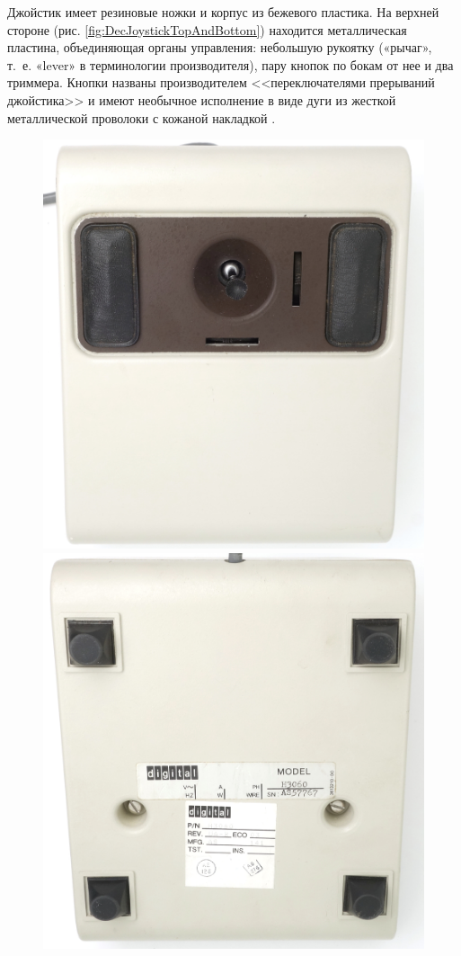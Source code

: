 \documentclass[11pt, a4paper]{article}
\begin{document}
Джойстик имеет резиновые ножки и корпус из бежевого пластика. На верхней стороне (рис. \ref{fig:DecJoystickTopAndBottom}) находится металлическая пластина, объединяющая органы управления: небольшую рукоятку («рычаг», т.~е. «lever» в терминологии производителя), пару кнопок по бокам от нее и два триммера. Кнопки названы производителем <<переключателями прерываний джойстика>> \cite{vsv11} и имеют необычное исполнение в виде дуги из жесткой металлической проволоки с кожаной накладкой \cite{joystick}.

\begin{figure}[h]
    \centering
    \includegraphics[scale=0.38]{1978_dec_h3060_joystick/top_15.jpg}
    \includegraphics[scale=0.38]{1978_dec_h3060_joystick/bottom_15.jpg}

\end{figure}
\end{document}

